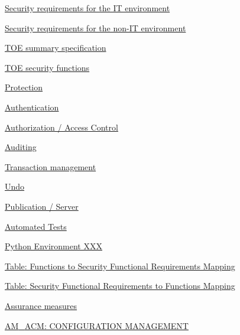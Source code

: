 \documentclass[10pt,a4paper,english]{article}
\begin{document}
\begin{list}{}{}
\begin{list}{}{}
\item {} \href{\#security-requirements-for-the-it-environment}{Security requirements for the IT environment}

\item {} \href{\#security-requirements-for-the-non-it-environment}{Security requirements for the non-IT environment}

\end{list}

\item {} \href{\#toe-summary-specification}{TOE summary specification}
\begin{list}{}{}
\item {} \href{\#toe-security-functions}{TOE security functions}

\item {} \href{\#protection}{Protection}

\item {} \href{\#authentication}{Authentication}

\item {} \href{\#authorization-access-control}{Authorization / Access Control}

\item {} \href{\#auditing}{Auditing}

\item {} \href{\#transaction-management}{Transaction management}

\item {} \href{\#undo}{Undo}

\item {} \href{\#publication-server}{Publication / Server}

\item {} \href{\#automated-tests}{Automated Tests}

\item {} \href{\#python-environment-xxx}{Python Environment XXX}

\item {} \href{\#table-functions-to-security-functional-requirements-mapping}{Table: Functions to Security Functional Requirements Mapping}

\item {} \href{\#table-security-functional-requirements-to-functions-mapping}{Table: Security Functional Requirements to Functions Mapping}

\item {} \href{\#assurance-measures}{Assurance measures}
\begin{list}{}{}
\item {} \href{\#am-acm-configuration-management}{AM{\_}ACM: CONFIGURATION MANAGEMENT}


\end{list}
\end{list}
\end{list}
\end{document}
